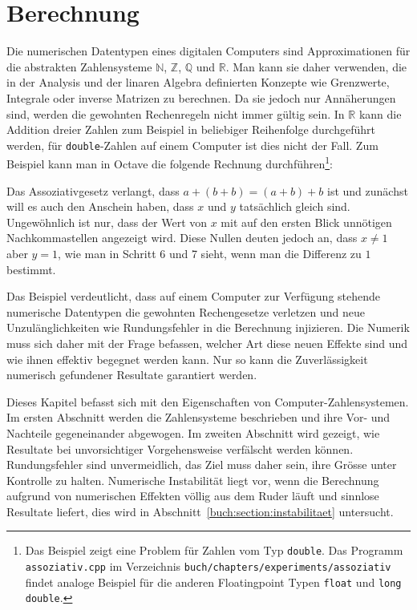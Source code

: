 %
%
%
\chapter{Berechnung
\label{chapter:berechnung}}
\rhead{}
Die numerischen Datentypen eines digitalen Computers sind Approximationen
für die abstrakten Zahlensysteme $\mathbb{N}$, $\mathbb{Z}$, $\mathbb{Q}$
und $\mathbb{R}$.
Man kann sie daher verwenden, die in der Analysis und der linaren Algebra
definierten Konzepte wie Grenzwerte, Integrale oder inverse Matrizen zu
berechnen.
Da sie jedoch nur Annäherungen sind, werden die gewohnten Rechenregeln 
nicht immer gültig sein.
In $\mathbb{R}$ kann die Addition dreier Zahlen zum Beispiel in beliebiger
Reihenfolge durchgeführt werden, für \texttt{double}-Zahlen auf einem
Computer ist dies nicht der Fall.
Zum Beispiel kann man in Octave die folgende Rechnung durchführen\footnote{%
Das Beispiel zeigt eine Problem für Zahlen vom Typ \texttt{double}.
Das Programm \texttt{assoziativ.cpp} im Verzeichnis
\texttt{buch/chapters/experiments/assoziativ} findet analoge Beispiel für
die anderen Floatingpoint Typen \texttt{float} und \texttt{long double}.}:

Das Assoziativgesetz verlangt, dass $a+(b+b)=(a+b)+b$ ist und zunächst
will es auch den Anschein haben, dass $x$ und $y$ tatsächlich gleich sind.
Ungewöhnlich ist nur, dass der Wert von $x$ mit auf den ersten Blick
unnötigen Nachkommastellen angezeigt wird.
Diese Nullen deuten jedoch an, dass $x\ne 1$ aber $y=1$, wie man in Schritt
6 und 7 sieht, wenn man die Differenz zu $1$ bestimmt.

Das Beispiel verdeutlicht, dass auf einem Computer zur Verfügung
stehende numerische Datentypen die gewohnten Rechengesetze verletzen und
neue Unzulänglichkeiten wie Rundungsfehler in die Berechnung injizieren.
Die Numerik muss sich daher mit der Frage befassen, welcher Art diese
neuen Effekte sind und wie ihnen effektiv begegnet werden kann.
Nur so kann die Zuverlässigkeit numerisch gefundener Resultate
garantiert werden.

Dieses Kapitel befasst sich mit den Eigenschaften von Computer-Zahlensystemen.
Im ersten Abschnitt werden die Zahlensysteme beschrieben und ihre 
Vor- und Nachteile gegeneinander abgewogen.
Im zweiten Abschnitt wird gezeigt, wie Resultate bei unvorsichtiger
Vorgehensweise verfälscht werden können.
Rundungsfehler sind unvermeidlich, das Ziel muss daher sein, ihre
Grösse unter Kontrolle zu halten.
Numerische Instabilität liegt vor, wenn die Berechnung aufgrund von
numerischen Effekten völlig aus dem Ruder läuft und sinnlose Resultate
liefert, dies wird in Abschnitt~\ref{buch:section:instabilitaet}
untersucht.


